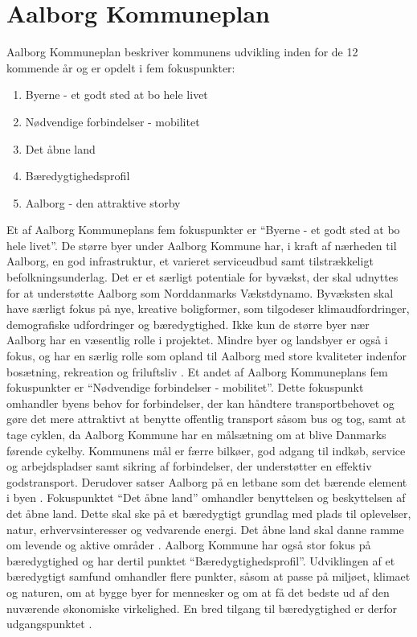 \section{Aalborg Kommuneplan}
Aalborg Kommuneplan beskriver kommunens udvikling inden for de 12 kommende år og er opdelt i fem fokuspunkter: 
\begin{enumerate}
	\item Byerne - et godt sted at bo hele livet
	\item Nødvendige forbindelser - mobilitet
	\item Det åbne land
	\item Bæredygtighedsprofil
	\item Aalborg - den attraktive storby
\end{enumerate}
Et af Aalborg Kommuneplans fem fokuspunkter er “Byerne - et godt sted at bo hele livet”. De større byer under Aalborg Kommune har, i kraft af nærheden til Aalborg, en god infrastruktur,  et varieret serviceudbud samt tilstrækkeligt befolkningsunderlag. Det er et særligt potentiale for byvækst, der skal udnyttes for at understøtte Aalborg som Norddanmarks Vækstdynamo. 
\newline \indent{     }  Byvæksten skal have særligt fokus på nye, kreative boligformer, som tilgodeser klimaudfordringer, demografiske udfordringer og bæredygtighed. 
\newline \indent{     }  Ikke kun de større byer nær Aalborg har en væsentlig rolle i projektet. Mindre byer og landsbyer er også i fokus, og har en særlig rolle som opland til Aalborg med store kvaliteter indenfor bosætning, rekreation og friluftsliv \citep{byerne}.
\newline
\newline
Et andet af Aalborg Kommuneplans fem fokuspunkter er “Nødvendige forbindelser - mobilitet”. Dette fokuspunkt omhandler byens behov for forbindelser, der kan håndtere transportbehovet og gøre det mere attraktivt at benytte offentlig transport såsom bus og tog, samt at tage cyklen, da  Aalborg Kommune har en målsætning om at blive Danmarks førende cykelby. Kommunens mål er færre bilkøer, god adgang til indkøb, service og arbejdspladser samt sikring af forbindelser, der understøtter en effektiv godstransport. Derudover satser Aalborg på en letbane som det bærende element i byen \citep{mobilitet}.
\newline
\newline
Fokuspunktet “Det åbne land” omhandler benyttelsen og beskyttelsen af det åbne land. Dette skal ske på et bæredygtigt grundlag med plads til oplevelser, natur, erhvervsinteresser og vedvarende energi. Det åbne land skal danne ramme om levende og aktive områder \citep{land}.
\newline
\newline
Aalborg Kommune har også stor fokus på bæredygtighed og har dertil punktet “Bæredygtighedsprofil”. Udviklingen af et bæredygtigt samfund omhandler flere punkter, såsom at passe på miljøet, klimaet og naturen, om at bygge byer for mennesker og om at få det bedste ud af den nuværende økonomiske virkelighed. En bred tilgang til bæredygtighed er derfor udgangspunktet \citep{profil}.

